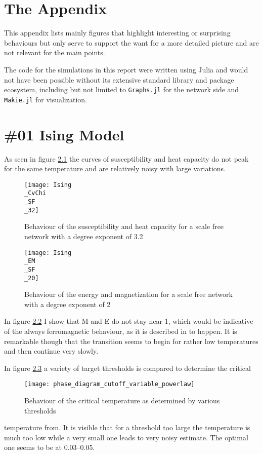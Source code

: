 \appendix
\chapter{The Appendix}
This appendix lists mainly figures that highlight interesting or surprising behaviours but only serve to support the want for a more detailed picture and are not relevant for the main points. 

The code for the simulations in this report were written using Julia\cite{Julia-2017} and would not have been possible without its extensive standard library and package ecosystem, including but not limited to \texttt{Graphs.jl}\cite{Graphs2021} for the network side and \texttt{Makie.jl}\cite{DanischKrumbiegel2021} for visualization.

\chapter[Task 01]{\#01 Ising Model}
As seen in figure \ref{fig:cv-chi-01} the curves of susceptibility and heat capacity do not peak for the same temperature and are relatively noisy with large variations.
\begin{figure}[h]
	\centering
	\texttt{[image: Ising\\\_CvChi\\\_SF\\\_32]}
	\caption{Behaviour of the susceptibility and heat capacity for a scale free network with a degree exponent of 3.2}
	\label{fig:cv-chi-01}
\end{figure}

\begin{figure}[h!]
	\centering
	\texttt{[image: Ising\\\_EM\\\_SF\\\_20]}
	\caption{Behaviour of the energy and magnetization for a scale free network with a degree exponent of 2}
	\label{fig:EM-SF-2.0-01}
\end{figure}
In figure \ref{fig:EM-SF-2.0-01} I show that M and E do not stay near 1, which would be indicative of the always ferromagnetic behaviour, as it is described in \cite{Leone2002} to happen. It is remarkable though that the transition seems to begin for rather low temperatures and then continue very slowly.

In figure \ref{fig:SF-comp-theory-01} a variety of target thresholds is compared to determine the critical
\begin{figure}[h]
	\centering
	\texttt{[image: phase\_diagram\_cutoff\_variable\_powerlaw]}
	\caption{Behaviour of the critical temperature as determined by various thresholds}
	\label{fig:SF-comp-theory-01}
\end{figure}
temperature from. It is visible that for a threshold too large the temperature is much too low while a very small one leads to very noisy estimate. The optimal one seems to be at \numrange{0.03}{0.05}.


